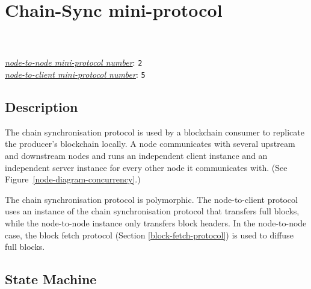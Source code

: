 \section{Chain-Sync mini-protocol}
\label{chain-sync-protocol}
\\
\\
\hyperref[table:node-to-node-protocol-numbers]{\textit{node-to-node mini-protocol number}}: \texttt{2}\\
\hyperref[table:node-to-client-protocol-numbers]{\textit{node-to-client mini-protocol number}}: \texttt{5}\\

\newcommand{\StCanAwait}{\state{StCanAwait}}
\newcommand{\StMustReply}{\state{StMustReply}}
\newcommand{\StIntersect}{\state{StIntersect}}
\newcommand{\MsgRequestNext}{\msg{MsgRequestNext}}
\newcommand{\MsgAwaitReply}{\msg{MsgAwaitReply}}
\newcommand{\MsgRollForward}{\msg{MsgRollForward}}
\newcommand{\MsgRollBackward}{\msg{MsgRollBackward}}
\newcommand{\MsgFindIntersect}{\msg{MsgFindIntersect}}
\newcommand{\MsgIntersectFound}{\msg{MsgIntersectFound}}
\newcommand{\MsgIntersectNotFound}{\msg{MsgIntersectNotFound}}

\subsection{Description}
The chain synchronisation protocol is used by a blockchain consumer
to replicate the producer's blockchain locally.
A node communicates with several upstream and downstream nodes
and runs an independent client instance and an independent server instance for every
other node it communicates with.
(See Figure~\ref{node-diagram-concurrency}.)

The chain synchronisation protocol is polymorphic.
The node-to-client protocol uses an instance of the chain synchronisation protocol
that transfers full blocks, while the node-to-node instance only transfers block headers.
In the node-to-node case, the block fetch protocol (Section \ref{block-fetch-protocol})
is used to diffuse full blocks.

\subsection{State Machine}

